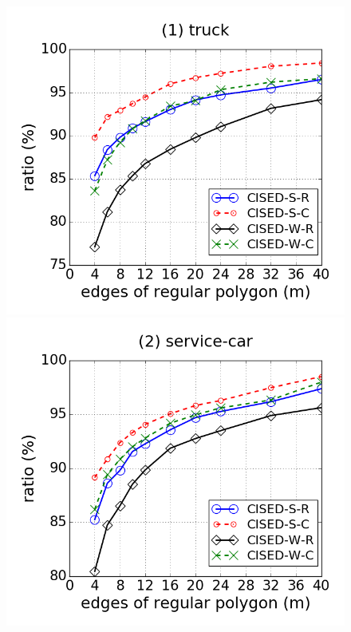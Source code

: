 \begin{figure}[tb!]
\centering
\includegraphics[scale = 0.250]{figures/Exp-M-poly-time-ratio-truck.png}
\includegraphics[scale = 0.250]{figures/Exp-M-poly-time-ratio-service.png}

\end{figure}
